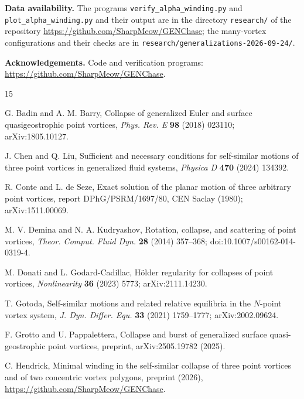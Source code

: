 \documentclass[11pt]{article}
\theoremstyle{definition}
\begin{document}
\medskip
{\sloppy\noindent\textbf{Data availability.} The programs \texttt{verify\_alpha\_winding.py} and \texttt{plot\_alpha\_winding.py} and their output are in the directory \texttt{research/} of the repository \url{https://github.com/SharpMeow/GENChase}; the many-vortex configurations and their checks are in \texttt{research/generalizations-2026-09-24/}.\par}

{\sloppy\noindent\textbf{Acknowledgements.} Code and verification programs: \url{https://github.com/SharpMeow/GENChase}.\par}

\smallskip
{}

\begin{thebibliography}{15}

 G. Badin and A. M. Barry, Collapse of generalized Euler and surface quasigeostrophic point vortices, \emph{Phys. Rev. E} \textbf{98} (2018) 023110; arXiv:1805.10127.

 J. Chen and Q. Liu, Sufficient and necessary conditions for self-similar motions of three point vortices in generalized fluid systems, \emph{Physica D} \textbf{470} (2024) 134392.

 R. Conte and L. de Seze, Exact solution of the planar motion of three arbitrary point vortices, report DPhG/PSRM/1697/80, CEN Saclay (1980); arXiv:1511.00069.

 M. V. Demina and N. A. Kudryashov, Rotation, collapse, and scattering of point vortices, \emph{Theor. Comput. Fluid Dyn.} \textbf{28} (2014) 357--368; doi:10.1007/s00162-014-0319-4.

 M. Donati and L. Godard-Cadillac, H\"older regularity for collapses of point vortices, \emph{Nonlinearity} \textbf{36} (2023) 5773; arXiv:2111.14230.

 T. Gotoda, Self-similar motions and related relative equilibria in the $N$-point vortex system, \emph{J. Dyn. Differ. Equ.} \textbf{33} (2021) 1759--1777; arXiv:2002.09624.

 F. Grotto and U. Pappalettera, Collapse and burst of generalized surface quasi-geostrophic point vortices, preprint, arXiv:2505.19782 (2025).

 C. Hendrick, Minimal winding in the self-similar collapse of three point vortices and of two concentric vortex polygons, preprint (2026), \url{https://github.com/SharpMeow/GENChase}.


\end{thebibliography}
\end{document}
